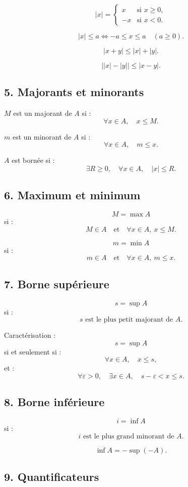 \documentclass[11pt,a4paper]{article}
\newcommand{\abs}[1]{\left|#1\right|}
\newcommand{\ssi}{\Longleftrightarrow}
\begin{document}
\[
\abs{x}=
\begin{cases}
x & \text{si }x\geq0,\\
-x & \text{si }x<0.
\end{cases}
\]

\[
\abs{x}\leq a
\ssi
-a\leq x\leq a
\quad(a\geq0).
\]

\[
\abs{x+y}\leq\abs{x}+\abs{y}.
\]

\[
\bigl|\abs{x}-\abs{y}\bigr|\leq\abs{x-y}.
\]

\subsection*{5. Majorants et minorants}

\(M\) est un majorant de \(A\) si :
\[
\forall x\in A,\quad x\leq M.
\]

\(m\) est un minorant de \(A\) si :
\[
\forall x\in A,\quad m\leq x.
\]

\(A\) est bornée si :
\[
\exists R\geq0,\quad \forall x\in A,\quad \abs{x}\leq R.
\]

\subsection*{6. Maximum et minimum}

\[
M=\max A
\]
si :
\[
M\in A
\quad\text{et}\quad
\forall x\in A,\ x\leq M.
\]

\[
m=\min A
\]
si :
\[
m\in A
\quad\text{et}\quad
\forall x\in A,\ m\leq x.
\]

\subsection*{7. Borne supérieure}

\[
s=\sup A
\]
si :
\[
s\text{ est le plus petit majorant de }A.
\]

Caractérisation :
\[
s=\sup A
\]
si et seulement si :
\[
\forall x\in A,\quad x\leq s,
\]
et :
\[
\forall \varepsilon>0,\quad \exists x\in A,\quad s-\varepsilon<x\leq s.
\]

\subsection*{8. Borne inférieure}

\[
i=\inf A
\]
si :
\[
i\text{ est le plus grand minorant de }A.
\]

\[
\inf A=-\sup(-A).
\]

\subsection*{9. Quantificateurs}
\end{document}
